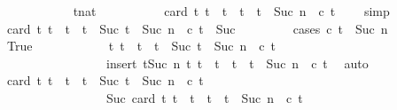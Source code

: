 \begin{isabellebody}
\ \ \isamarkupfalse%
\ {\isacharminus}\isanewline
\ \ \ \ \isacommand{{\isacharbraceleft}}\isamarkupfalse%
\ \isamarkupfalse%
\ t{\isacharcolon}{\isacharcolon}nat\isanewline
\ \ \ \ \ \ \isamarkupfalse%
\ {\isacharasterisk}\ \isamarkupfalse%
\ {\isacharasterisk}{\isacharasterisk}{\isacharcolon}{\isacartoucheopen}card\ {\isacharbraceleft}t{\isacharprime}{\isachardot}\ t\ {\isasymle}\ t{\isacharprime}\ {\isasymand}\ t{\isacharprime}\ {\isacharless}\ t\ {\isacharplus}\ Suc\ n\ {\isasymand}\ c\ t{\isacharprime}{\isacharbraceright}\ {\isasymle}\ {}{\isacartoucheclose}\ \isamarkupfalse%
\ simp\isanewline
\ \ \ \ \ \ \isamarkupfalse%
\ {\isacartoucheopen}card\ {\isacharbraceleft}t{\isacharprime}{\isachardot}\ t\ {\isasymle}\ t{\isacharprime}\ {\isasymand}\ t{\isacharprime}\ {\isacharless}\ Suc\ {\isacharparenleft}t\ {\isacharplus}\ Suc\ n{\isacharparenright}\ {\isasymand}\ c\ t{\isacharprime}{\isacharbraceright}\ {\isasymle}\ Suc\ {}{\isacartoucheclose}\isanewline
\ \ \ \ \ \ \isamarkupfalse%
\ {\isacharparenleft}cases\ {\isacartoucheopen}c\ {\isacharparenleft}t\ {\isacharplus}\ Suc\ n{\isacharparenright}{\isacartoucheclose}{\isacharparenright}\isanewline
\ \ \ \ \ \ \ \ \isamarkupfalse%
\ True\isanewline
\ \ \ \ \ \ \ \ \ \ \isamarkupfalse%
\ {\isacartoucheopen}{\isacharbraceleft}t{\isacharprime}{\isachardot}\ t\ {\isasymle}\ t{\isacharprime}\ {\isasymand}\ t{\isacharprime}\ {\isacharless}\ Suc\ {\isacharparenleft}t\ {\isacharplus}\ Suc\ n{\isacharparenright}\ {\isasymand}\ c\ t{\isacharprime}{\isacharbraceright}\isanewline
\ \ \ \ \ \ \ \ \ \ \ \ \ \ \ \ {\isacharequal}\ insert\ {\isacharparenleft}t{\isacharplus}Suc\ n{\isacharparenright}\ {\isacharbraceleft}t{\isacharprime}{\isachardot}\ t\ {\isasymle}\ t{\isacharprime}\ {\isasymand}\ t{\isacharprime}\ {\isacharless}\ t\ {\isacharplus}\ Suc\ n\ {\isasymand}\ c\ t{\isacharprime}{\isacharbraceright}{\isacartoucheclose}\ \isamarkupfalse%
\ auto\isanewline
\ \ \ \ \ \ \ \ \ \ \isamarkupfalse%
\ {\isacartoucheopen}card\ {\isacharbraceleft}t{\isacharprime}{\isachardot}\ t\ {\isasymle}\ t{\isacharprime}\ {\isasymand}\ t{\isacharprime}\ {\isacharless}\ Suc\ {\isacharparenleft}t\ {\isacharplus}\ Suc\ n{\isacharparenright}\ {\isasymand}\ c\ t{\isacharprime}{\isacharbraceright}\isanewline
\ \ \ \ \ \ \ \ \ \ \ \ \ \ \ \ {\isacharequal}\ Suc\ {\isacharparenleft}card\ {\isacharbraceleft}t{\isacharprime}{\isachardot}\ t\ {\isasymle}\ t{\isacharprime}\ {\isasymand}\ t{\isacharprime}\ {\isacharless}\ t\ {\isacharplus}\ Suc\ n\ {\isasymand}\ c\ t{\isacharprime}{\isacharbraceright}{\isacharparenright}{\isacartoucheclose}\ \isamarkupfalse%

\end{isabellebody}
